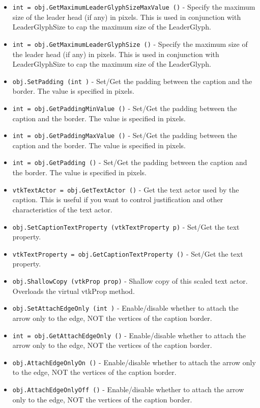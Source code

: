 \begin{itemize}
\item  \verb|int = obj.GetMaximumLeaderGlyphSizeMaxValue ()| -  Specify the maximum size of the leader head (if any) in pixels. This 
 is used in conjunction with LeaderGlyphSize to cap the maximum size of
 the LeaderGlyph.

\item  \verb|int = obj.GetMaximumLeaderGlyphSize ()| -  Specify the maximum size of the leader head (if any) in pixels. This 
 is used in conjunction with LeaderGlyphSize to cap the maximum size of
 the LeaderGlyph.

\item  \verb|obj.SetPadding (int )| -  Set/Get the padding between the caption and the border. The value
 is specified in pixels.

\item  \verb|int = obj.GetPaddingMinValue ()| -  Set/Get the padding between the caption and the border. The value
 is specified in pixels.

\item  \verb|int = obj.GetPaddingMaxValue ()| -  Set/Get the padding between the caption and the border. The value
 is specified in pixels.

\item  \verb|int = obj.GetPadding ()| -  Set/Get the padding between the caption and the border. The value
 is specified in pixels.

\item  \verb|vtkTextActor = obj.GetTextActor ()| -  Get the text actor used by the caption. This is useful if you want to control
 justification and other characteristics of the text actor.

\item  \verb|obj.SetCaptionTextProperty (vtkTextProperty p)| -  Set/Get the text property.

\item  \verb|vtkTextProperty = obj.GetCaptionTextProperty ()| -  Set/Get the text property.

\item  \verb|obj.ShallowCopy (vtkProp prop)| -  Shallow copy of this scaled text actor. Overloads the virtual
 vtkProp method.

\item  \verb|obj.SetAttachEdgeOnly (int )| -  Enable/disable whether to attach the arrow only to the edge, 
 NOT the vertices of the caption border.

\item  \verb|int = obj.GetAttachEdgeOnly ()| -  Enable/disable whether to attach the arrow only to the edge, 
 NOT the vertices of the caption border.

\item  \verb|obj.AttachEdgeOnlyOn ()| -  Enable/disable whether to attach the arrow only to the edge, 
 NOT the vertices of the caption border.

\item  \verb|obj.AttachEdgeOnlyOff ()| -  Enable/disable whether to attach the arrow only to the edge, 
 NOT the vertices of the caption border.

\end{itemize}
